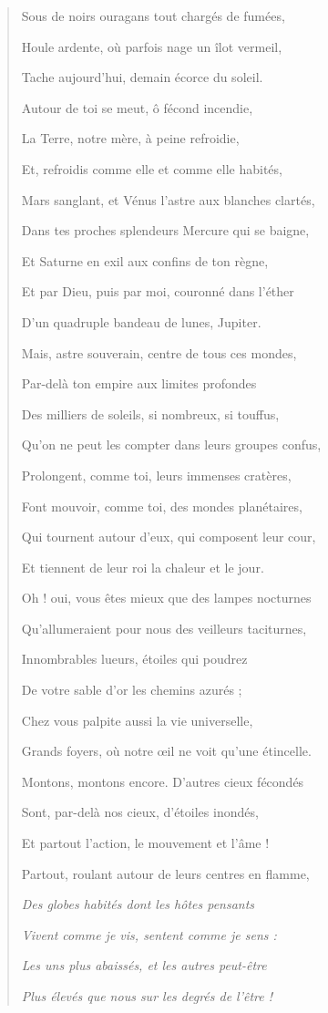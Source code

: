 \documentclass[a4paper, 11pt, oneside]{article}
\begin{document}
\begin{quotation}
Sous de noirs ouragans tout chargés de fumées,

Houle ardente, où parfois nage un îlot vermeil,

Tache aujourd'hui, demain écorce du soleil.

Autour de toi se meut, ô fécond incendie,

La Terre, notre mère, à peine refroidie,

Et, refroidis comme elle et comme elle habités,

Mars sanglant, et Vénus l'astre aux blanches clartés,

Dans tes proches splendeurs Mercure qui se baigne,

Et Saturne en exil aux confins de ton règne,

Et par Dieu, puis par moi, couronné dans l'éther

D'un quadruple bandeau de lunes, Jupiter.

\bigskip

Mais, astre souverain, centre de tous ces mondes,

Par-delà ton empire aux limites profondes

Des milliers de soleils, si nombreux, si touffus,

Qu'on ne peut les compter dans leurs groupes confus,

Prolongent, comme toi, leurs immenses cratères,

Font mouvoir, comme toi, des mondes planétaires,

Qui tournent autour d'eux, qui composent leur cour,

Et tiennent de leur roi la chaleur et le jour.

Oh ! oui, vous êtes mieux que des lampes nocturnes

Qu'allumeraient pour nous des veilleurs taciturnes,

Innombrables lueurs, étoiles qui poudrez

De votre sable d'or les chemins azurés ;

Chez vous palpite aussi la vie universelle,

Grands foyers, où notre œil ne voit qu'une étincelle.

Montons, montons encore. D'autres cieux fécondés

Sont, par-delà nos cieux, d'étoiles inondés,

Et partout l'action, le mouvement et l'âme !

Partout, roulant autour de leurs centres en flamme,

\emph{Des globes habités dont les hôtes pensants}

\emph{Vivent comme je vis, sentent comme je sens :}

\emph{Les uns plus abaissés, et les autres peut-être}

\emph{Plus élevés que nous sur les degrés de l'être !}
\end{quotation}
\end{document}
